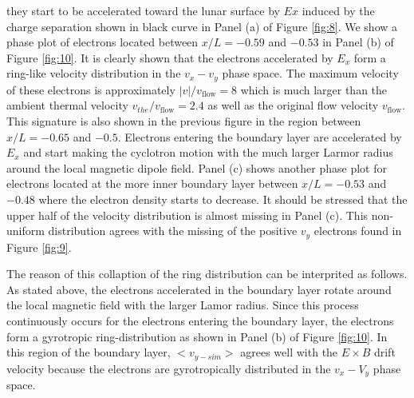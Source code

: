 \documentclass[draft,jgrga]{agutex2015}
\begin{document}
\begin{article}
they start to be accelerated toward the lunar surface 
by $Ex$ induced by the charge separation 
shown in black curve in Panel (a) of Figure \ref{fig:8}.
We show a phase plot of electrons located between 
$x/L = -0.59$ and $-0.53$ in Panel (b) of Figure \ref{fig:10}.
It is clearly shown that the electrons accelerated by $E_x$ form 
a ring-like velocity distribution in the $v_x-v_y$ phase space.
The maximum velocity of these electrons is approximately 
$|v|/v_\mathrm{flow} = 8$ which is much larger than 
the ambient thermal velocity $v_{the}/v_\mathrm{flow} = 2.4$ 
as well as the original flow velocity $v_\mathrm{flow}$.
This signature is also shown in the previous figure
in the region between $x/L =-0.65$ and $-0.5$.
Electrons entering the boundary layer
are accelerated by $E_x$ and start making the cyclotron motion 
with the much larger Larmor radius 
around the local magnetic dipole field. 
Panel (c) shows another phase plot for electrons located at the more inner boundary
layer between $x/L = -0.53$ and $-0.48$ 
where the electron density starts to decrease.
It should be stressed that 
the upper half of the velocity distribution is almost missing in Panel (c).
This non-uniform distribution agrees with the missing of the positive $v_y$ 
electrons found in Figure \ref{fig:9}.

The reason of this collaption of the ring distribution can be interprited 
as follows.
As stated above, the electrons accelerated in the boundary layer
rotate around the local magnetic field with the larger Lamor radius.
Since this process continuously occurs for the electrons 
entering the boundary layer,
the electrons form a gyrotropic ring-distribution
as shown in Panel (b) of Figure \ref{fig:10}.
In this region of the boundary layer, 
$<v_{y-sim}>$ agrees well with the $E \times B$ 
drift velocity because the electrons are gyrotropically 
distributed in the $v_x-V_y$ phase space.


%  



\end{article}
\end{document}
